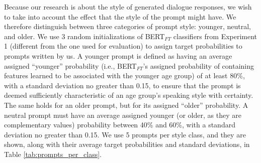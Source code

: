Because our research is about the style of generated dialogue responses, we wish to take into account the effect that the style of the prompt might have. We therefore distinguish between three categories of prompt style: younger, neutral, and older. We use 3 random initializations of BERT$_{FT}$ classifiers from Experiment 1 (different from the one used for evaluation) to assign target probabilities to prompts written by us. A younger prompt is defined as having an average assigned ``younger'' probability (i.e., BERT$_{FT}$'s assigned probability of containing features learned to be associated with the younger age group) of at least 80\%, with a standard deviation no greater than 0.15, to ensure that the prompt is deemed sufficiently characteristic of an age group's speaking style with certainty. The same holds for an older prompt, but for its assigned ``older'' probability. A neutral prompt must have an average assigned younger (or older, as they are complementary values) probability between 40\% and 60\%, with a standard deviation no greater than 0.15. We use 5 prompts per style class, and they are shown, along with their average target probabilities and standard deviations, in Table \ref{tab:prompts_per_class}. 

